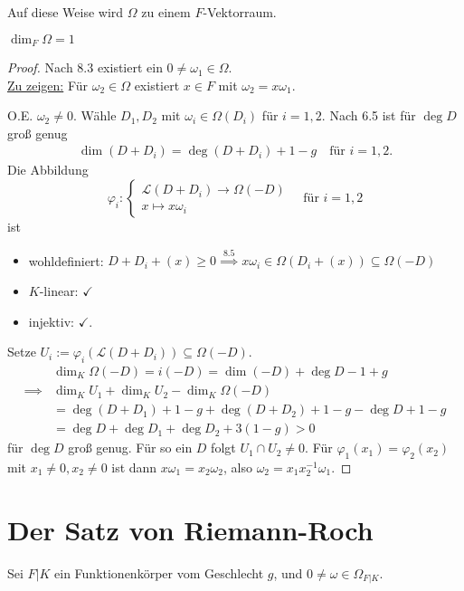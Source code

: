 \begin{bemerkungnr}
    Auf diese Weise wird $\Omega$ zu einem $F$-Vektorraum.
\end{bemerkungnr}

\begin{satz}
    $\dim_F \Omega=1$
\end{satz}
\begin{proof}
    Nach 8.3 existiert ein $0 \neq \omega_1 \in \Omega$.\\
    \underline{Zu zeigen:} Für $\omega_2 \in \Omega$ existiert $x \in F$ mit $\omega_2 = x\omega_1$.

    O.E. $\omega_2 \ne 0$. Wähle $D_1,D_2$ mit $\omega_i \in \Omega(D_i)$ für $i=1,2$.
    Nach 6.5 ist für $\deg D$ groß genug
    \begin{align*}
        \dim (D+D_i) = \deg (D+D_i) + 1 - g \quad \text{für } i = 1,2.
    \end{align*}
    Die Abbildung
    $$ \varphi_i : \begin{cases}
        \mathcal{L}(D+D_i) \to \Omega(-D)\\
        x \mapsto x\omega_i
    \end{cases} \quad \text{für } i=1,2$$
    ist 
    \begin{itemize}
        \item wohldefiniert: $D+D_i + (x) \geq 0 \stackrel{8.5}{\implies} x \omega_i \in \Omega(D_i + (x)) \subseteq \Omega(-D)$
        \item $K$-linear: $\checkmark$
        \item injektiv: $\checkmark$.
    \end{itemize}
    Setze $U_i := \varphi_i(\mathcal{L}(D+D_i)) \subseteq \Omega(-D)$.
    \begin{align*}
        &\dim_K \Omega(-D) = i(-D) = \dim(-D) + \deg D - 1 + g\\
        \implies & \dim_K U_1 + \dim_K U_2 - \dim_K \Omega(-D)\\
        &=\deg(D+D_1) + 1 - g + \deg(D+D_2) + 1 -g - \deg D + 1 - g\\
        &= \deg D + \deg D_1 + \deg D_2 + 3(1-g) > 0
    \end{align*}
    für $\deg D$ groß genug.
    Für so ein $D$ folgt $U_1 \cap U_2 \ne 0$. Für $\varphi_1(x_1) = \varphi_2(x_2)$ mit $x_1\ne 0, x_2 \ne 0$
    ist dann $x\omega_1 = x_2 \omega_2$, also $\omega_2 = x_1 x_2^{-1}\omega_1$.
\end{proof}

\section{Der Satz von Riemann-Roch}
Sei $F|K$ ein Funktionenkörper vom Geschlecht $g$, und $0 \ne \omega \in \Omega_{F|K}$.

